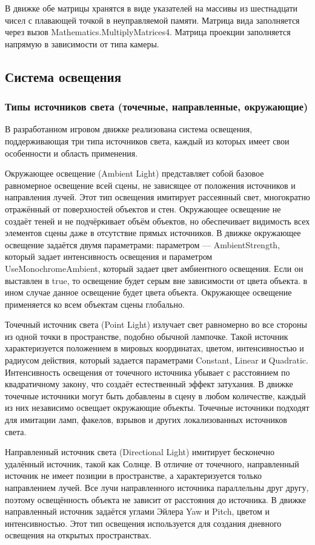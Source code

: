 В движке обе матрицы хранятся в виде указателей на массивы из шестнадцати чисел с плавающей точкой в неуправляемой памяти. Матрица вида заполняется через вызов Mathematics.MultiplyMatrices4. Матрица проекции заполняется напрямую в зависимости от типа камеры.

\subsection{Система освещения}
\subsubsection{Типы источников света (точечные, направленные, окружающие)}
В разработанном игровом движке реализована система освещения, поддерживающая три типа источников света, каждый из которых имеет свои особенности и область применения.

Окружающее освещение (Ambient Light) представляет собой базовое равномерное освещение всей сцены, не зависящее от положения источников и направления лучей. Этот тип освещения имитирует рассеянный свет, многократно отражённый от поверхностей объектов и стен. Окружающее освещение не создаёт теней и не подчёркивает объём объектов, но обеспечивает видимость всех элементов сцены даже в отсутствие прямых источников. В движке окружающее освещение задаётся двумя параметрами: параметром — AmbientStrength, который задает интенсивность освещения и параметром UseMonochromeAmbient, который задает цвет амбиентного освещения. Если он выставлен в true, то освещение будет серым вне зависимости от цвета объекта. в ином случае данное освещение будет цвета объекта. Окружающее освещение применяется ко всем объектам сцены глобально.

Точечный источник света (Point Light) излучает свет равномерно во все стороны из одной точки в пространстве, подобно обычной лампочке. Такой источник характеризуется положением в мировых координатах, цветом, интенсивностью и радиусом действия, который задается параметрами Constant, Linear и Quadratic. Интенсивность освещения от точечного источника убывает с расстоянием по квадратичному закону, что создаёт естественный эффект затухания. В движке точечные источники могут быть добавлены в сцену в любом количестве, каждый из них независимо освещает окружающие объекты. Точечные источники подходят для имитации ламп, факелов, взрывов и других локализованных источников света.

Направленный источник света (Directional Light) имитирует бесконечно удалённый источник, такой как Солнце. В отличие от точечного, направленный источник не имеет позиции в пространстве, а характеризуется только направлением лучей. Все лучи направленного источника параллельны друг другу, поэтому освещённость объекта не зависит от расстояния до источника. В движке направленный источник задаётся углами Эйлера Yaw и Pitch, цветом и интенсивностью. Этот тип освещения используется для создания дневного освещения на открытых пространствах.

